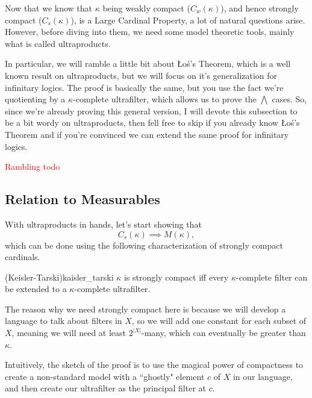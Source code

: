 Now that we know that $\kappa$ being weakly compact ($C_w(\kappa)$), and hence strongly compact ($C_s(\kappa)$), is a Large Cardinal Property, a lot of natural questions arise. However, before diving into them, we need some model theoretic tools, mainly what is called ultraproducts.

In particular, we will ramble a little bit about Łoś's Theorem, which is a well known result on ultraproducts, but we will focus on it's generalization for infinitary logics. The proof is basically the same, but you use the fact we're quotienting by a $\kappa$-complete ultrafilter, which allows us to prove the $\bigwedge$ cases. So, since we're already proving this general version, I will devote this subsection to be a bit wordy on ultraproducts, then fell free to skip if you already know Łoś's Theorem and if you're convinced we can extend the same proof for infinitary logics.

\textcolor{red}{Rambling todo}

\subsection{Relation to Measurables}

With ultraproducts in hands, let's start showing that
$$C_s(\kappa)\implies M(\kappa),$$
which can be done using the following characterization of strongly compact cardinals.

\begin{theorem}{(Keisler-Tarski)}{kaisler_tarski}
    $\kappa$ is strongly compact iff every $\kappa$-complete filter can be extended to a $\kappa$-complete ultrafilter.
\end{theorem}

The reason why we need strongly compact here is because we will develop a language to talk about filters in $X$, so we will add one constant for each subset of $X$, meaning we will need at least $2^{|X|}$-many, which can eventually be greater than $\kappa$.

Intuitively, the sketch of the proof is to use the magical power of compactness to create a non-standard model with a ``ghostly" element $c$ of $X$ in our language, and then create our ultrafilter as the principal filter at $c$.

